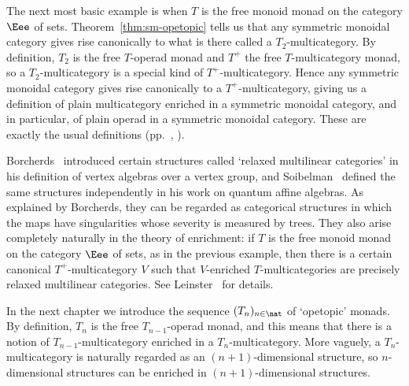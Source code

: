 \begin{example}
The next most basic example is when $T$ is the free monoid monad on the
category $\Eee$ of sets.  Theorem~\ref{thm:sm-opetopic} tells us that any
symmetric monoidal category gives rise canonically to what is there called
a $T_2$-multicategory.  By definition, $T_2$ is the free $T$-operad monad
and $T^+$ the free $T$-multicategory monad, so a $T_2$-multicategory is a
special kind of $T^+$-multicategory.  Hence any symmetric monoidal category
gives rise canonically to a $T^+$-multicategory, giving us a definition of
plain multicategory%
%
%
enriched in a symmetric monoidal category, and in
particular, of plain operad%
%
%
in a symmetric monoidal category.  These are
exactly the usual definitions (pp.~\pageref{p:sym-enr-mti},
\pageref{p:defn-V-Operad}).
\end{example}

\begin{example}	
Borcherds~\cite{Borch}%
%
%
introduced certain structures called `relaxed%
%
%
%
%
multilinear categories' in his definition of vertex%
%
%
algebras over a vertex
group, and Soibelman~\cite{SoiMTC, SoiMBC}%
%
%
defined the same structures
independently in his work on quantum affine algebras.  As explained by
Borcherds, they can be regarded as categorical structures in which the maps
have singularities%
%
%
whose severity is measured by trees.  They also arise
completely naturally in the theory of enrichment: if $T$ is the free monoid
monad on the category $\Eee$ of sets, as in the previous example, then
there is a certain canonical $T^+$-multicategory $V$ such that
$V$-enriched%
%
%
$T$-multicategories are precisely relaxed multilinear categories.  See
Leinster~\cite[Ch.~4]{GECM} for details.
\end{example}

\begin{example}
In the next chapter we introduce the sequence $(T_n)_{n\in\nat}$ of
`opetopic'%
%
%
monads.  By definition, $T_n$ is the free $T_{n-1}$-operad
monad, and this means that there is a notion of $T_{n-1}$-multicategory
enriched in a $T_n$-multicategory.  More vaguely, a $T_n$-multicategory is
naturally regarded as an $(n+1)$-dimensional structure, so $n$-dimensional
structures can be enriched in $(n+1)$-dimensional structures.
\end{example}



